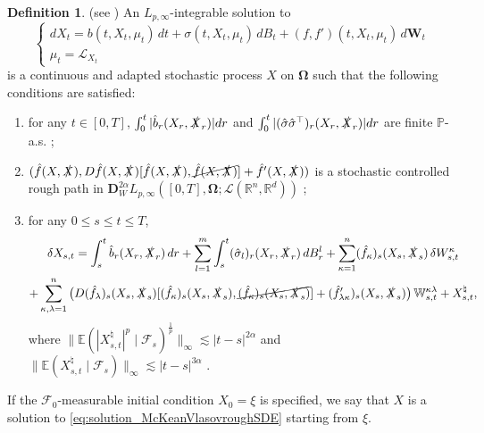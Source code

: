 \documentclass[10pt, a4paper]{article} %
\newcommand{\R}{\mathbb{R}}
\newcommand{\E}{\mathbb{E}}
\theoremstyle{definition}
\newtheorem{defn}{Definition}[section]
\theoremstyle{plain}
\begin{document}
\begin{defn} \label{def:solution_McKeanVlasovroughSDE}
    (see \cite[Definition 3.7]{FHL25})
    An $L_{p,\infty}$-integrable solution to \begin{equation} \label{eq:solution_McKeanVlasovroughSDE}
    \begin{cases}
        dX_t = b(t, X_t,\mu_t) \, dt + \sigma(t, X_t,\mu_t) \, dB_t + (f,f')(t, X_t,\mu_t) \, d\mathbf{W}_t \\
        \mu_t = \mathcal{L}_{X_t}
    \end{cases}
    \end{equation}
    is a continuous and adapted stochastic process $X$ on $\mathbf{\Omega}$ such that the following conditions are satisfied: \begin{enumerate} \renewcommand{\labelenumi}{(\roman{enumi})}
        \item for any $t \in [0,T]$, $\int_0^t |\hat{b}_r(X_r,\slashed{X}_r)| dr$ and $\int_0^t |(\hat{\sigma} \hat{\sigma}^\top)_r(X_r,\slashed{X}_r)| dr$ are finite $\mathbb{P}$-a.s. ;
        \item $(\hat{f}(X,\slashed{X}), D\hat{f}(X,\slashed{X})[\hat{f}(X,\slashed{X}),\cancel{\hat{f}(X,\slashed{X})}]  + \hat{f}'(X,\slashed{X}))$ is a stochastic controlled rough path in $\mathbf{D}_W^{2\alpha}L_{p,\infty}([0,T],\mathbf{\Omega};\mathscr{L}(\R^n,\R^d))$ ;
        \item for any $0 \le s \le t \le T$, \begin{multline} \label{eq:Davieexpansion_solutionMcKeanVlasovroughSDE}
            \delta X_{s,t} = \int_s^t \hat{b}_r(X_r,\slashed{X}_r) \, dr + \sum_{l=1}^m \int_s^t (\hat{\sigma}_l)_r (X_r,\slashed{X}_r) \, dB^l_r + \sum_{\kappa=1}^n (\hat{f}_\kappa)_s(X_s,\slashed{X}_s) \,  \delta W^\kappa_{s,t}  \\ + \sum_{\kappa,\lambda=1}^n \big(D(\hat{f}_\lambda)_s(X_s,\slashed{X}_s) [(\hat{f}_\kappa)_s(X_s,\slashed{X}_s), \cancel{(\hat{f}_\kappa)_s(X_s,\slashed{X}_s)}] + (\hat{f}'_{\lambda \kappa})_s(X_s,\slashed{X}_s) \big) \, \mathbb{W}^{\kappa \lambda}_{s,t} + X^\natural_{s,t} ,
            \end{multline}
            where $\| \E( |X^\natural_{s,t}|^p  \mid \mathcal{F}_s)^\frac{1}{p} \|_\infty \lesssim |t-s|^{2\alpha}$ and $\|\E(X^\natural_{s,t} \mid \mathcal{F}_s)\|_\infty\lesssim |t-s|^{3\alpha}$ .
    \end{enumerate}
    If the $\mathcal{F}_0$-measurable initial condition $X_0=\xi$ is specified, we say that $X$ is a solution to \eqref{eq:solution_McKeanVlasovroughSDE} starting from $\xi$.
\end{defn}
\end{document}

